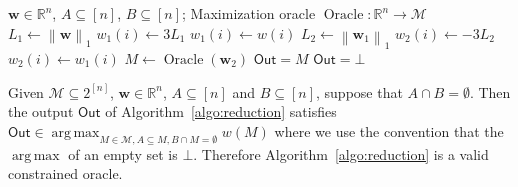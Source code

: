\documentclass{article}
\newcommand{\M}{\mathcal M}
\newcommand{\del}{\backslash}
\newcommand{\RR}{\mathbb R}
\DeclareMathOperator*{\argmax}{arg\,max}
\DeclareMathOperator{\Oracle}{Oracle}
\DeclareMathOperator{\COracle}{COracle}
\newcommand{\out}{\mathsf{Out}}
\newcommand{\nor}[1]{\left\|#1\right\|}
\renewcommand{\vec}[1]{\boldsymbol{#1}}
\begin{document}


\begin{algorithm}[htbp]
{
\small
\begin{algorithmic}[1]
\Require $\vec w\in \RR^n$, $A \subseteq [n]$, $B\subseteq [n]$; Maximization oracle $\Oracle: \RR^n \rightarrow \M$
\State $L_1\gets \nor{\vec w}_1$
    \State $w_1(i) \gets 3L_1$
  \Else
    \State $w_1(i) \gets w(i)$
  \EndIf
\EndFor
\State $L_2 \gets \nor{\vec w_1}_1$
    \State $w_2(i) \gets -3L_2$
  \Else
    \State $w_2(i) \gets w_1(i)$
  \EndIf
\EndFor
\State $M \gets \Oracle(\vec w_2)$
  \State $\out=M$
\Else
  \State $\out=\bot$
\EndIf
\State{\textbf{return: } $\out$}
\end{algorithmic}
\caption{$\COracle(\vec w, A,B)$}
\label{algo:reduction}
}
\end{algorithm}


\begin{lemma}
\label{fact:coracle}
Given $\M\subseteq 2^{[n]}$, $\vec w\in \RR^{n}$, $A \subseteq [n]$ and  $B\subseteq [n]$, suppose that $A\cap B=\emptyset$.
Then the output $\out$ of  Algorithm~\ref{algo:reduction} satisfies
$\out\in \argmax_{M\in \M, A\subseteq M, B\cap M=\emptyset}w(M)$
where we use the convention that the $\argmax$ of an empty set is $\bot$.
Therefore Algorithm~\ref{algo:reduction} is a valid constrained oracle.
\end{lemma}
\end{document}
